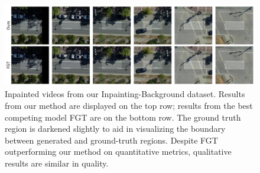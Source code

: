 \begin{figure}[t]
\centering
\includegraphics[width=\linewidth]{figures/bg_3119.pdf}
\caption[A comparison of inpaintings from our method and FGT on a video from our Inpainting-Background dataset.]{Inpainted videos from our Inpainting-Background dataset. Results from our method are displayed on the top row; results from the best competing model FGT \citep{fgt} are on the bottom row. The ground truth region is darkened slightly to aid in visualizing the boundary between generated and ground-truth regions. Despite FGT outperforming our method on quantitative metrics, qualitative results are similar in quality.}
\label{fig:background}
\end{figure}
